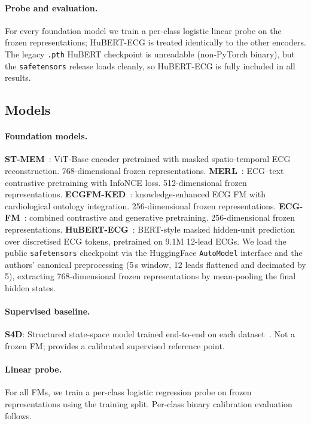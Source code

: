 \paragraph{Probe and evaluation.}
For every foundation model we train a per-class logistic linear probe on the frozen
representations; HuBERT-ECG is treated identically to the other encoders. The legacy
\texttt{.pth} HuBERT checkpoint is unreadable (non-PyTorch binary), but the
\texttt{safetensors} release loads cleanly, so HuBERT-ECG is fully included in all results.

\subsection{Models}

\paragraph{Foundation models.}
\textbf{ST-MEM}~\citep{na2024stmem}: ViT-Base encoder pretrained with masked spatio-temporal
ECG reconstruction. 768-dimensional frozen representations.
\textbf{MERL}~\citep{liu2024merl}: ECG--text contrastive pretraining with InfoNCE loss.
512-dimensional frozen representations.
\textbf{ECGFM-KED}~\citep{ecgfmked2024}: knowledge-enhanced ECG FM with cardiological
ontology integration. 256-dimensional frozen representations.
\textbf{ECG-FM}~\citep{mckeen2024ecgfm}: combined contrastive and generative pretraining.
256-dimensional frozen representations.
\textbf{HuBERT-ECG}~\citep{hubertecg2024}: BERT-style masked hidden-unit prediction over
discretised ECG tokens, pretrained on 9.1M 12-lead ECGs. We load the public
\texttt{safetensors} checkpoint via the HuggingFace \texttt{AutoModel} interface and the
authors' canonical preprocessing (5\,s window, 12 leads flattened and decimated by 5),
extracting 768-dimensional frozen representations by mean-pooling the final hidden states.

\paragraph{Supervised baseline.}
\textbf{S4D}: Structured state-space model trained end-to-end on each
dataset~\citep{gu2022s4ecg, s4d2024ecg}. Not a frozen FM; provides a calibrated
supervised reference point.

\paragraph{Linear probe.}
For all FMs, we train a per-class logistic regression probe on frozen representations
using the training split. Per-class binary calibration evaluation follows.

